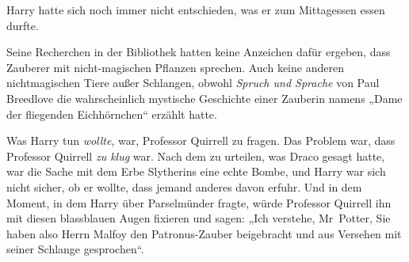 Harry hatte sich noch immer nicht entschieden, was er zum Mittagessen essen durfte.

Seine Recherchen in der Bibliothek hatten keine Anzeichen dafür ergeben, dass Zauberer mit nicht-magischen Pflanzen sprechen. Auch keine anderen nichtmagischen Tiere außer Schlangen, obwohl \emph{Spruch und Sprache} von Paul Breedlove die wahrscheinlich mystische Geschichte einer Zauberin namens „Dame der fliegenden Eichhörnchen“ erzählt hatte.

Was Harry tun \emph{wollte}, war, Professor Quirrell zu fragen. Das Problem war, dass Professor Quirrell \emph{zu klug} war. Nach dem zu urteilen, was Draco gesagt hatte, war die Sache mit dem Erbe Slytherins eine echte Bombe, und Harry war sich nicht sicher, ob er wollte, dass jemand anderes davon erfuhr. Und in dem Moment, in dem Harry über Parselmünder fragte, würde Professor Quirrell ihn mit diesen blassblauen Augen fixieren und sagen: „Ich verstehe, Mr~Potter, Sie haben also Herrn Malfoy den Patronus-Zauber beigebracht und aus Versehen mit seiner Schlange gesprochen“.

